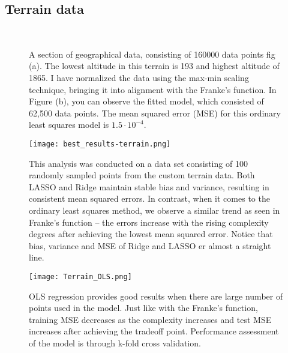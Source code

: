 \documentclass[a4paper,12pt]{article}
\begin{document}
\subsection{Terrain data}

\begin{figure}[H]
\\
\caption{A section of geographical data, consisting of 160000 data points fig (a). The lowest altitude in this terrain is 193 and highest altitude of 1865. I have normalized the data using the max-min scaling technique, bringing it into alignment with the Franke's function. In Figure (b), you can observe the fitted model, which consisted of 62,500 data points. The mean squared error (MSE) for this ordinary least squares model is $1.5\cdot10^{-4}$.}
\end{figure}




\begin{figure}[H]
\centerline{\texttt{[image: best\_results-terrain.png]}}
\caption{This analysis was conducted on a data set consisting of 100 randomly sampled points from the custom terrain data. Both LASSO and Ridge maintain stable bias and variance, resulting in consistent mean squared errors. In contrast, when it comes to the ordinary least squares method, we observe a similar trend as seen in Franke's function – the errors increase with the rising complexity degrees after achieving the lowest mean squared error. Notice that bias, variance and MSE of Ridge and LASSO er almost a straight line.}
\label{fig}
\end{figure}



\begin{figure}[H]
\centerline{\texttt{[image: Terrain\_OLS.png]}}
\caption{OLS regression provides good results when there are large number of points used in the model. Just like with the Franke's function, training MSE decreases as the complexity increases and test MSE increases after achieving the tradeoff point. Performance assessment of the model is through k-fold cross validation.}
\label{fig}
\end{figure}
\end{document}

